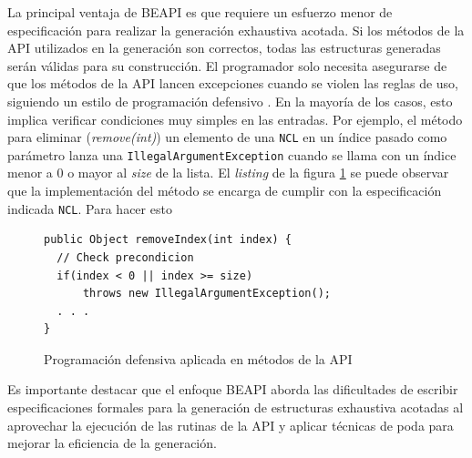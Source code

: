 La principal ventaja de \textsf{BEAPI} es que requiere un esfuerzo menor de especificación para realizar la generación exhaustiva acotada. Si los métodos de la API utilizados en la generación son correctos, todas las estructuras generadas serán válidas para su construcción. El programador solo necesita asegurarse de que los métodos de la API lancen excepciones cuando se violen las reglas de uso, siguiendo un estilo de programación defensivo \cite{Liskov00}. En la mayoría de los casos, esto implica verificar condiciones muy simples en las entradas. Por ejemplo, el método para eliminar (\emph{remove(int)}) un elemento de una \texttt{NCL} en un índice pasado como parámetro lanza una \texttt{IllegalArgumentException} cuando se llama con un índice menor a 0 o mayor al \emph{size} de la lista. El \emph{listing} de la figura \ref{fig:algoProgDefensiva}  se puede observar que la implementación del método se encarga de cumplir con la especificación indicada \texttt{NCL}.
Para hacer esto


\begin{figure}[!thb]
\begin{lstlisting}
public Object removeIndex(int index) {
  // Check precondicion
  if(index < 0 || index >= size)
      throws new IllegalArgumentException();  
  . . .
}

\end{lstlisting}
\caption{Programación defensiva aplicada en métodos de la API}
\label{fig:algoProgDefensiva}
\end{figure}


Es importante destacar que el enfoque \textsf{BEAPI} aborda las dificultades de escribir especificaciones formales para la generación de estructuras exhaustiva acotadas al aprovechar la ejecución de las rutinas de la API y aplicar técnicas de poda para mejorar la eficiencia de la generación.



